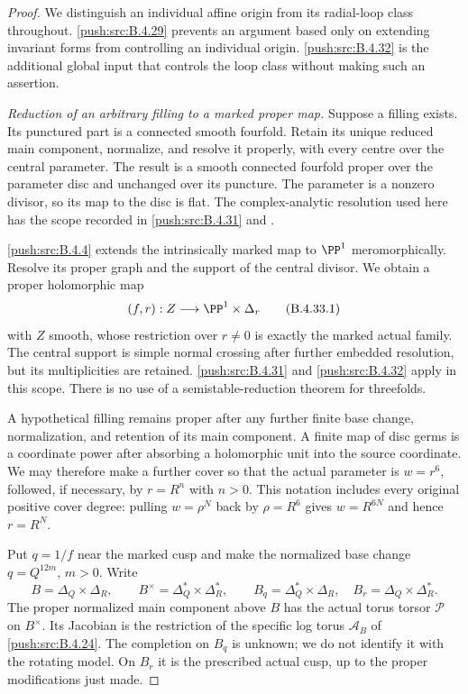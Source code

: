 \begin{proof}
We distinguish an individual affine origin from its
radial-loop class throughout. \ref{push:src:B.4.29} prevents an
argument based only on extending invariant forms
from controlling an individual origin. \ref{push:src:B.4.32} is
the additional global input that controls the loop
class without making such an assertion.

\emph{Reduction of an arbitrary filling to a marked proper map.}
Suppose a filling exists. Its punctured part is a
connected smooth fourfold. Retain its unique reduced
main component, normalize, and resolve it properly,
with every centre over the central parameter. The
result is a smooth connected fourfold proper over
the parameter disc and unchanged over its puncture.
The parameter is a nonzero divisor, so its map to
the disc is flat. The complex-analytic resolution
used here has the scope recorded in \ref{push:src:B.4.31} and
\citet[Theorems 1.6 and 1.10]{BM95AB}.

\ref{push:src:B.4.4} extends the intrinsically marked map to
$\PP^1$ meromorphically. Resolve its proper graph
and the support of the central divisor. We obtain
a proper holomorphic map
\[
 (f,r):Z\longrightarrow\PP^1\times\Delta_r
 \tag{B.4.33.1}
\]
with $Z$ smooth, whose restriction over $r\ne0$
is exactly the marked actual family. The central
support is simple normal crossing after further
embedded resolution, but its multiplicities are
retained. \ref{push:src:B.4.31} and \ref{push:src:B.4.32} apply in this scope.
There is no use of a semistable-reduction theorem
for threefolds.

A hypothetical filling remains proper after any
further finite base change, normalization, and
retention of its main component. A finite map of
disc germs is a coordinate power after absorbing
a holomorphic unit into the source coordinate.
We may therefore make a further cover so that
the actual parameter is $w=r^6$, followed, if
necessary, by $r=R^n$ with $n>0$. This notation
includes every original positive cover degree:
pulling $w=\rho^N$ back by $\rho=R^6$ gives
$w=R^{6N}$ and hence $r=R^N$.

Put $q=1/f$ near the marked cusp and make the
normalized base change $q=Q^{12m}$, $m>0$.
Write
\[
 B=\Delta_Q\times\Delta_R,\qquad
 B^\times=\Delta_Q^*\times\Delta_R^*,\qquad
 B_q=\Delta_Q^*\times\Delta_R,\quad
 B_r=\Delta_Q\times\Delta_R^*.
 \tag{B.4.33.2}
\]
The proper normalized main component above $B$
has the actual torus torsor $\mathscr P$ on
$B^\times$. Its Jacobian is the restriction of
the specific log torus $\mathcal A_B$ of
\ref{push:src:B.4.24}. The completion on $B_q$ is unknown;
we do not identify it with the rotating model.
On $B_r$ it is the prescribed actual cusp,
up to the proper modifications just made.


\end{proof}
